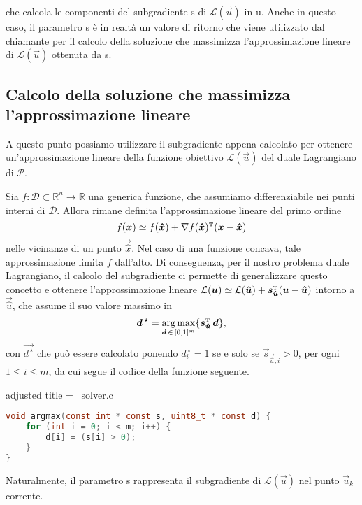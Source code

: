 \noindent
che calcola le componenti del subgradiente {\jbm s} di \( \mathcal{L}(\vec{u}) \) in {\jbm u}. Anche in questo caso, il
parametro {\jbm s} è in realtà un valore di ritorno che viene utilizzato dal chiamante per il calcolo
della soluzione che massimizza l'approssimazione lineare di \( \mathcal{L}(\vec{u}) \) ottenuta da {\jbm s}.

\subsection{Calcolo della soluzione che massimizza l'approssimazione lineare}

A questo punto possiamo utilizzare il subgradiente appena calcolato per ottenere un'approssimazione lineare della
funzione obiettivo \( \mathcal{L}(\vec{u}) \) del duale Lagrangiano di \( \mathcal{P} \).

Sia \( f\colon \mathcal{D}\subset\mathbb{R}^n \to \mathbb{R} \) una generica funzione, che assumiamo differenziabile nei
punti interni di \( \mathcal{D} \). Allora rimane definita l'approssimazione lineare del primo ordine
\begin{equation}
    f(\bm{x}) \simeq f(\bm{\hat{x}}) + \nabla f(\bm{\hat{x}})^{\scriptscriptstyle\mathrm{T}}(\bm{x} - \bm{\hat{x}})
\end{equation}
nelle vicinanze di un punto \( \vec{\hat{x}} \). Nel caso di una funzione concava, tale approssimazione limita \( f \)
dall'alto. Di conseguenza, per il nostro problema duale Lagrangiano, il calcolo del subgradiente ci permette di
generalizzare questo concetto e ottenere l'approssimazione lineare \( \mathcal{L}(\bm{u}) \simeq \mathcal{L}(\bm{\bm{\hat{u}}}) +
\bm{s}_{\bm{\hat{u}}}^{\scriptscriptstyle\mathrm{T}}(\bm{u} - \bm{\hat{u}})\) intorno a \( \vec{\hat{u}} \), che assume il suo valore massimo in
\begin{equation}
\bm{d^{\,\star}} = \operatorname*{arg\,max}_{\bm{d}
\,\in\, [0, 1]^m } \{\bm{s}_{\bm{\hat{u}}}^{\scriptscriptstyle\mathrm{T}}\, \bm{d}\},
\end{equation}
con
\(
    \vec{d^{\,\star}}
\)
che può essere calcolato ponendo \( d^{\,\star}_i = 1 \) se e solo se \( \vec{s}_{\vec{\hat{u}},i} > 0 \), per ogni \( 1 \leq i
\leq m \), da cui segue il codice della funzione seguente.

\begin{code}{adjusted title = {\cicon\ solver.c}}
\begin{lstlisting}[language=c, style = style, caption={Calcolo di \( \vec{d}_k = \argmax_{\vec{d} \,\in\, [0, 1]^m}
\,\{\vec{s}_k^{\tr}\,\vec{d}\}\).}]
void argmax(const int * const s, uint8_t * const d) {
    for (int i = 0; i < m; i++) {
        d[i] = (s[i] > 0);
    }
}\end{lstlisting}
\end{code}
\noindent
Naturalmente, il parametro {\jbm s} rappresenta il subgradiente di \( \mathcal{L}(\vec{u}) \) nel punto \( \vec{u}_k \)
corrente.

